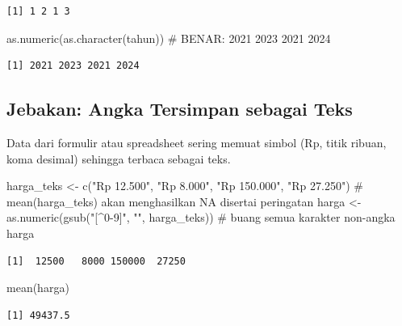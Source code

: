 \documentclass[
  indonesian,
  letterpaper,
]{book}
\newenvironment{Shaded}{\begin{snugshade}}{\end{snugshade}}
\newcommand{\CommentTok}[1]{\textcolor[rgb]{0.37,0.37,0.37}{#1}}
\newcommand{\FunctionTok}[1]{\textcolor[rgb]{0.28,0.35,0.67}{#1}}
\newcommand{\NormalTok}[1]{\textcolor[rgb]{0.00,0.23,0.31}{#1}}
\newcommand{\OtherTok}[1]{\textcolor[rgb]{0.00,0.23,0.31}{#1}}
\newcommand{\StringTok}[1]{\textcolor[rgb]{0.13,0.47,0.30}{#1}}
\begin{document}
\begin{verbatim}
[1] 1 2 1 3
\end{verbatim}

\begin{Shaded}
\begin{Highlighting}[]
\FunctionTok{as.numeric}\NormalTok{(}\FunctionTok{as.character}\NormalTok{(tahun)) }\CommentTok{\# BENAR: 2021 2023 2021 2024}
\end{Highlighting}
\end{Shaded}

\begin{verbatim}
[1] 2021 2023 2021 2024
\end{verbatim}

\subsection{Jebakan: Angka Tersimpan sebagai
Teks}\label{jebakan-angka-tersimpan-sebagai-teks}

Data dari formulir atau spreadsheet sering memuat simbol (Rp, titik
ribuan, koma desimal) sehingga terbaca sebagai teks.

\begin{Shaded}
\begin{Highlighting}[]
\NormalTok{harga\_teks }\OtherTok{\textless{}{-}} \FunctionTok{c}\NormalTok{(}\StringTok{"Rp 12.500"}\NormalTok{, }\StringTok{"Rp 8.000"}\NormalTok{, }\StringTok{"Rp 150.000"}\NormalTok{, }\StringTok{"Rp 27.250"}\NormalTok{)}
\CommentTok{\# mean(harga\_teks) akan menghasilkan NA disertai peringatan}
\NormalTok{harga }\OtherTok{\textless{}{-}} \FunctionTok{as.numeric}\NormalTok{(}\FunctionTok{gsub}\NormalTok{(}\StringTok{"[\^{}0{-}9]"}\NormalTok{, }\StringTok{""}\NormalTok{, harga\_teks)) }\CommentTok{\# buang semua karakter non{-}angka }
\NormalTok{harga}
\end{Highlighting}
\end{Shaded}

\begin{verbatim}
[1]  12500   8000 150000  27250
\end{verbatim}

\begin{Shaded}
\begin{Highlighting}[]
\FunctionTok{mean}\NormalTok{(harga)}
\end{Highlighting}
\end{Shaded}

\begin{verbatim}
[1] 49437.5
\end{verbatim}
\end{document}
